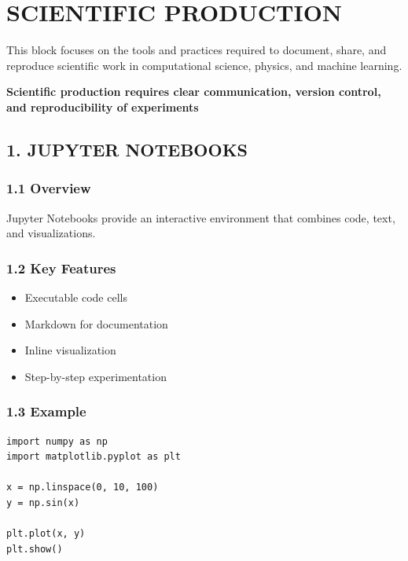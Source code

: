 \chapter{SCIENTIFIC PRODUCTION}

This block focuses on the tools and practices required to document, share, and reproduce scientific work in computational science, physics, and machine learning.

\begin{center}
\textbf{Scientific production requires clear communication, version control, and reproducibility of experiments}
\end{center}

\vspace{0.5cm}

\section*{1. JUPYTER NOTEBOOKS}

\subsection*{1.1 Overview}

Jupyter Notebooks provide an interactive environment that combines code, text, and visualizations.

\subsection*{1.2 Key Features}

\begin{itemize}
\item Executable code cells
\item Markdown for documentation
\item Inline visualization
\item Step-by-step experimentation
\end{itemize}

\subsection*{1.3 Example}

\begin{verbatim}
import numpy as np
import matplotlib.pyplot as plt

x = np.linspace(0, 10, 100)
y = np.sin(x)

plt.plot(x, y)
plt.show()
\end{verbatim}

